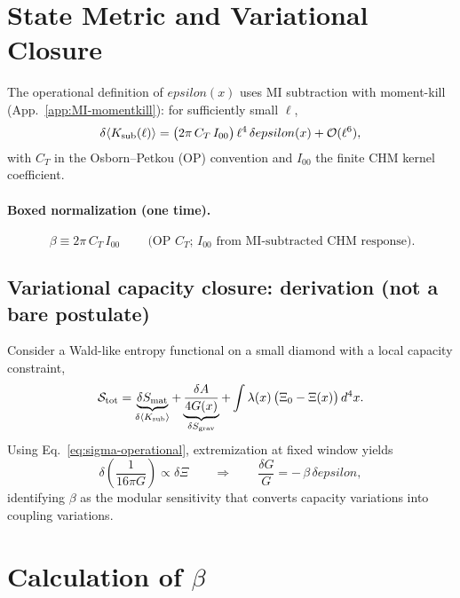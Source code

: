 \documentclass[aps,prd,onecolumn,superscriptaddress,nofootinbib]{revtex4-2}
\def\eps{epsilon}%
\def\boxed#1{#1}%
\newcommand{\eps}{\varepsilon}
\begin{document}
\section{State Metric and Variational Closure}
\label{sec:state-metric}
The operational definition of $\eps(x)$ uses MI subtraction with moment-kill (App.~\ref{app:MI-momentkill}): for sufficiently small $\ell$,
\begin{equation}
\label{eq:sigma-operational}
\delta\langle K_{\rm sub}(\ell)\rangle = \big(2\pi\, C_T\, I_{00}\big)\,\ell^4\,\delta\eps(x) + \mathcal O(\ell^6),
\end{equation}
with $C_T$ in the Osborn--Petkou (OP) convention and $I_{00}$ the finite CHM kernel coefficient.

\paragraph*{Boxed normalization (one time).}
\begin{equation}
\boxed{\ \beta \equiv 2\pi\, C_T\, I_{00}\ }\qquad
\text{(OP $C_T$; $I_{00}$ from MI-subtracted CHM response).}
\label{eq:beta-box}
\end{equation}

\subsection{Variational capacity closure: derivation (not a bare postulate)}
\label{sec:variational-closure}
Consider a Wald-like entropy functional on a small diamond with a local capacity constraint,
\begin{equation}
\mathcal{S}_{\rm tot} = \underbrace{\delta S_{\rm mat}}_{\delta\langle K_{\rm sub}\rangle} + \underbrace{\frac{\delta A}{4G(x)}}_{\delta S_{\rm grav}} + \int \lambda(x)\,\big(\Xi_0-\Xi(x)\big)\,d^4x.
\end{equation}
Using Eq.~\eqref{eq:sigma-operational}, extremization at fixed window yields
\begin{equation}
\delta\!\left(\frac{1}{16\pi G}\right) \propto \delta \Xi
\qquad\Rightarrow\qquad
\frac{\delta G}{G} = -\,\beta\,\delta \eps,
\end{equation}
identifying $\beta$ as the modular sensitivity that converts capacity variations into coupling variations.

\section{Calculation of \texorpdfstring{$\beta$}{beta}}
\label{sec:beta-calc}
\end{document}
